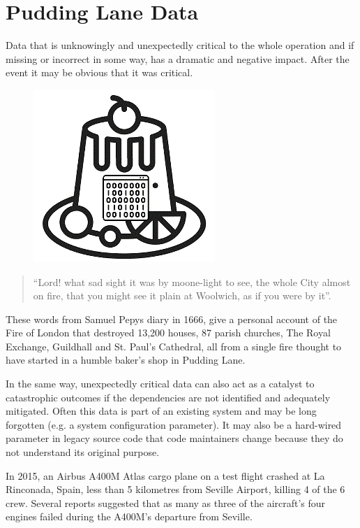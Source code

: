 \section{Pudding Lane Data}
 Data that is unknowingly and unexpectedly critical to the whole operation and if missing or incorrect in some way, has a dramatic and negative impact. After the event it may be obvious that it was critical.

\begin{figure}
  \includegraphics{images/cygPudding}
\end{figure}
\begin{quote}
“Lord! what sad sight it was by moone-light to see, the whole City almost on fire,
that you might see it plain at Woolwich, as if you were by it”.
\end{quote}

These words from Samuel Pepys diary in 1666, give a personal account of the Fire of London that
destroyed 13,200 houses, 87 parish churches, The Royal Exchange, Guildhall and St. Paul’s Cathedral,
all from a single fire thought to have started in a humble baker’s shop in Pudding Lane.

In the same way, unexpectedly \gls{critical data} can also act as a catalyst to catastrophic outcomes
if the dependencies are not identified and adequately mitigated.
Often this data is part of an existing system and may be long forgotten
(e.g. a system configuration parameter).
It may also be a hard-wired parameter in legacy source code that code maintainers change because
they do not understand its original purpose.

In 2015, an Airbus A400M Atlas cargo plane on a test flight crashed at La Rinconada, Spain,
less than 5 kilometres from Seville Airport, killing 4 of the 6 crew.
Several reports suggested that as many as three of the aircraft's four engines failed during
the A400M's departure from Seville.

